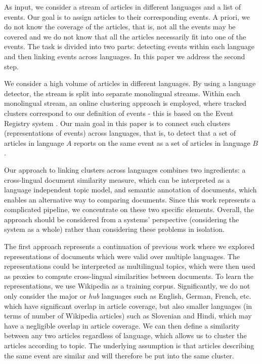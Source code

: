 \documentclass[twoside,11pt]{article}
\begin{document}
As input, we consider a stream of articles in different languages and a list of events. Our goal is to assign articles to their corresponding events. A priori, we do not know the coverage of the articles, that is, not all the events may be covered and we do not know that all the articles necessarily fit into one of the events. The task is divided into two parts: detecting events within each language and then linking events across languages. In this paper we address the second step.

 We consider a high volume of articles in different languages. By using a language detector, the stream is split into separate monolingual streams. Within each monolingual stream, an online clustering approach is employed, where tracked clusters correspond to our definition of events - this is based on the Event Registry system . Our main goal in this paper is to connect such clusters (representations of events) across languages, that is, to detect that a set of articles in language $A$ reports on the same event as a set of articles in language $B$.

Our approach to linking clusters across languages combines two ingredients: a cross-lingual document similarity measure, which can be interpreted as a language independent topic model, and semantic annotation of documents, which enables an alternative way to comparing documents. Since this work represents a complicated pipeline, we concentrate on these two specific elements. Overall, the approach should be considered from a systems' perspective (considering the system as a whole) rather than considering these problems in isolation.


The first approach represents a continuation of previous work  where we explored representations of documents which were valid over multiple languages.  The representations could be interpreted as multilingual topics, which were then used as proxies to compute cross-lingual similarities between documents. To learn the representations, we use Wikipedia as a training corpus. Significantly, we do not only consider the major or \emph{hub} languages such as English, German, French, etc. which have significant overlap in article coverage, but also smaller languages (in terms of number of Wikipedia articles) such as Slovenian and Hindi, which may have a negligible overlap in article coverage. We can then define a similarity between any two articles regardless of language,  which allows us to cluster the articles according to topic. The underlying assumption is that articles describing the same event are similar  and will therefore be put into the same cluster.
\end{document}
